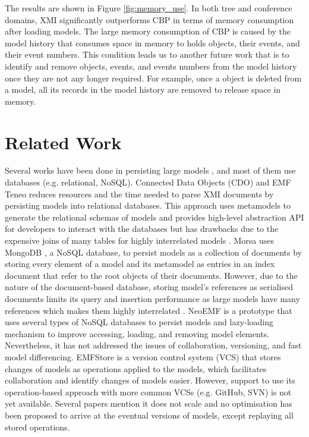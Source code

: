 \documentclass{llncs}
\begin{document}
The results are shown in Figure \ref{fig:memory_use}. In both tree and conference domains, XMI significantly outperforms CBP in terms of memory consumption after loading models. The large memory consumption of CBP is caused by the model history that consumes space in memory to holds objects, their events, and their event numbers. This condition leads us to another future work that is to identify and remove objects, events, and events numbers from the model history once they are not any longer required. For example, once a object is deleted from a model, all its records in the model history are removed to release space in memory. 

\section{Related Work}
\label{sec:related_work}
Several works have been done in persisting large models , and most of them use databases (e.g. relational, NoSQL). Connected Data Objects (CDO) \cite{eclipse2017cdo} and EMF Teneo \cite{eclipse2017teneo} reduces resources and the time needed to parse XMI documents by persisting models into relational databases. This approach uses metamodels to generate the relational schemas of models and provides  high-level abstraction API for developers to interact with the databases but has drawbacks due to the expensive joins of many tables for highly interrelated models \cite{barmpis2014evaluation}.    
Morsa \cite{pagan2011morsa} uses MongoDB \cite{mongodb2017what}, a NoSQL database, to persist models as a collection of documents by storing every element of a model and its metamodel as entries in an index document that refer to the root objects of their documents. However, due to the nature of the document-based database, storing model's references as serialised documents limits its query and insertion performance as large models have many references which makes them highly interrelated \cite{barmpis2014evaluation}. NeoEMF \cite{daniel2016neoemf} is a prototype that uses several types of NoSQL databases to persist models and lazy-loading mechanism to improve accessing, loading, and removing model elements. Nevertheless, it has not addressed the issues of collaboration, versioning, and fast model differencing. EMFStore \cite{koegel2010emfstore} is a version control system (VCS) that stores changes of models as operations applied to the models, which facilitates collaboration and identify changes of models easier. However, support to use its operation-based approach with more common VCSs (e.g. GitHub, SVN) is not yet available. Several papers mention it does not scale \cite{pagan2011morsa,kolovos2013research} and no optimisation has been proposed to arrive at the eventual versions of models, except replaying all stored operations. 
\end{document}
